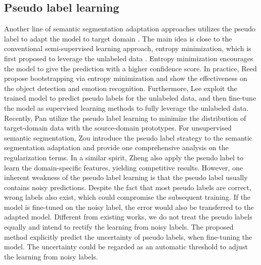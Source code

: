 \subsection{Pseudo label learning}
Another line of semantic segmentation adaptation approaches utilizes the pseudo label to adapt the model to target domain \cite{zou2018unsupervised,zou2019confidence,zheng2019unsupervised}. The main idea is close to the conventional semi-supervised learning approach, entropy minimization, which is first proposed to leverage the unlabeled data \cite{grandvalet2005semi}. Entropy minimization encourages the model to give the prediction with a higher confidence score.
In practice, Reed \etal \cite{reed2014training} propose bootstrapping via entropy minimization and show the effectiveness on the object detection and emotion recognition. Furthermore, Lee \etal \cite{lee2013pseudo}
exploit the trained model to predict pseudo labels for the unlabeled data, and then fine-tune the model as supervised learning methods to fully leverage the unlabeled data. Recently, Pan \etal \cite{pan2019transferrable} utilize the pseudo label learning to minimize the distribution of target-domain data with the source-domain prototypes. For unsupervised semantic segmentation, Zou \etal \cite{zou2019confidence,zou2018unsupervised} introduce the pseudo label strategy to the semantic segmentation adaptation and provide one comprehensive analysis on the regularization terms. In a similar spirit, Zheng \etal \cite{zheng2019unsupervised} also apply the pseudo label to learn the domain-specific features, yielding competitive results. However, one inherent weakness of the pseudo label learning is that the pseudo label usually contains noisy predictions. Despite the fact that most pseudo labels are correct, wrong labels also exist, which could compromise the subsequent training. If the model is fine-tuned on the noisy label, the error would also be transferred to the adapted model. 
Different from existing works, we do not treat the pseudo labels equally and intend to rectify the learning from noisy labels. The proposed method explicitly predict the uncertainty of pseudo labels, when fine-tuning the model. The uncertainty could be regarded as an automatic threshold to adjust the learning from noisy labels.

